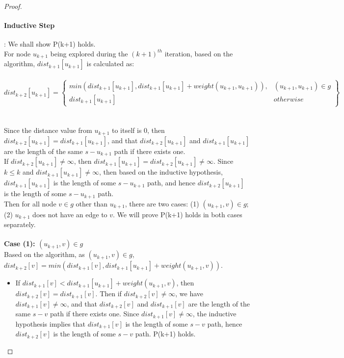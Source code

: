 \begin{proof}
\paragraph*{Inductive Step}: We shall show P(k+1) holds.
\\
For node $u_{k+1}$ being explored during the $(k+1)^{th}$ iteration, based on the algorithm, $dist_{k+1}[u_{k+1}]$ is calculated as: 
\\\\
\tab\[
        dist_{k+2}[u_{k+1}] = \left.
       \begin{cases} 
          min(dist_{k+1}[u_{k+1}], dist_{k+1}[u_{k+1}] + weight(u_{k+1},u_{k+1})), & (u_{k+1},u_{k+1}) \in g \\ 
          dist_{k+1}[u_{k+1}] & otherwise 
        \end{cases}
        \right\}
      \]
\\\\
Since the distance value from $u_{k+1}$ to itself is $0$, then $dist_{k+2}[u_{k+1}] = dist_{k+1}[u_{k+1}]$, and that $dist_{k+2}[u_{k+1}]$ and $dist_{k+1}[u_{k+1}]$ are the length of the same $s-u_{k+1}$ path if there exists one. 
\\
If $dist_{k+2}[u_{k+1}] \neq \infty$, then $dist_{k+1}[u_{k+1}] = dist_{k+2}[u_{k+1}] \neq \infty$. Since $k \leq k$ and $dist_{k+1}[u_{k+1}] \neq \infty$, then based on the inductive hypothesis, $dist_{k+1}[u_{k+1}]$ is the length of some $s-u_{k+1}$ path, and hence $dist_{k+2}[u_{k+1}]$ is the length of some $s-u_{k+1}$ path.
\\
Then for all node $v \in g$ other than $u_{k+1}$, there are two cases: (1) $(u_{k+1}, v) \in g$; (2) $u_{k+1}$ does not have an edge to $v$. We will prove P(k+1) holds in both cases separately. 
\\\\
\textbf{Case (1): $(u_{k+1}, v) \in g$}
\tab\\
Based on the algorithm, as $(u_{k+1}, v) \in g$, $dist_{k+2}[v] = min(dist_{k+1}[v], dist_{k+1}[u_{k+1}] + weight(u_{k+1}, v))$. 
\begin{itemize}
  \item If $dist_{k+1}[v] < dist_{k+1}[u_{k+1}] + weight(u_{k+1}, v)$, then $dist_{k+2}[v] = dist_{k+1}[v]$. Then if $dist_{k+2}[v] \neq \infty$, we have $dist_{k+1}[v] \neq \infty$, and that $dist_{k+2}[v]$ and $dist_{k+1}[v]$ are the length of the same $s-v$ path if there exists one. Since $dist_{k+1}[v] \neq \infty$, the inductive hypothesis implies that $dist_{k+1}[v]$ is the length of some $s-v$ path, hence $dist_{k+2}[v]$ is the length of some $s-v$ path. P(k+1) holds. 


\end{itemize}
\end{proof}
